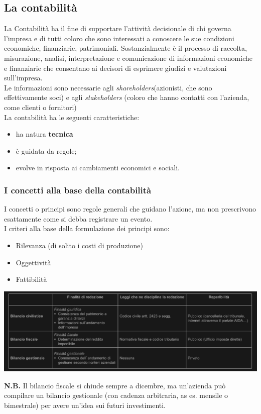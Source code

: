 \documentclass{article}
\begin{document}
\subsection{La contabilità}
La Contabilità ha il fine di supportare
l'attività decisionale di chi governa
l'impresa e di tutti coloro che sono
interessati a conoscere le sue condizioni
economiche, finanziarie, patrimoniali. Sostanzialmente è il
processo di raccolta, misurazione, analisi,
interpretazione e comunicazione di
informazioni economiche e finanziarie che
consentano ai decisori di esprimere giudizi
e valutazioni sull'impresa.\\
Le informazioni sono necessarie agli \textit{shareholders}(azionisti, che sono effettivamente soci) e agli \textit{stakeholders} (coloro che hanno contatti con l'azienda, come clienti o fornitori)
\vspace*{0.1cm}\\
La contabilità ha le
seguenti caratteristiche: 
\begin{itemize}
    \item ha natura \textbf{tecnica}
    \item è guidata da regole;
    \item evolve in risposta ai cambiamenti
    economici e sociali.
\end{itemize}


\subsubsection{I concetti alla base
della contabilità}
I concetti o principi sono regole generali
che guidano l'azione, ma non prescrivono
esattamente come si debba registrare un
evento.
\vspace*{0.1cm}\\
I criteri alla base della formulazione dei
principi sono:
\begin{itemize}
	\item Rilevanza (di solito i costi di produzione)
    \item Oggettività
    \item Fattibilità
\end{itemize}
\noindent{}
\begin{center}
    \includegraphics[scale=0.4]{Image/Tabella bilancio.png}
\end{center}
\textbf{N.B.} Il bilancio fiscale si chiude sempre a dicembre, ma un'azienda può compilare un bilancio gestionale (con cadenza arbitraria, as es. mensile o bimestrale) per avere un'idea sui futuri investimenti.
\end{document}
